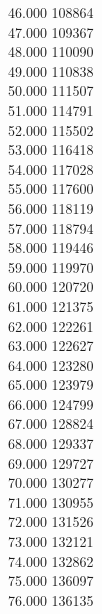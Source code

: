 { 46.000	108864 \\
 47.000	109367 \\
 48.000	110090 \\
 49.000	110838 \\
 50.000	111507 \\
 51.000	114791 \\
 52.000	115502 \\
 53.000	116418 \\
 54.000	117028 \\
 55.000	117600 \\
 56.000	118119 \\
 57.000	118794 \\
 58.000	119446 \\
 59.000	119970 \\
 60.000	120720 \\
 61.000	121375 \\
 62.000	122261 \\
 63.000	122627 \\
 64.000	123280 \\
 65.000	123979 \\
 66.000	124799 \\
 67.000	128824 \\
 68.000	129337 \\
 69.000	129727 \\
 70.000	130277 \\
 71.000	130955 \\
 72.000	131526 \\
 73.000	132121 \\
 74.000	132862 \\
 75.000	136097 \\
 76.000	136135 \\
}
